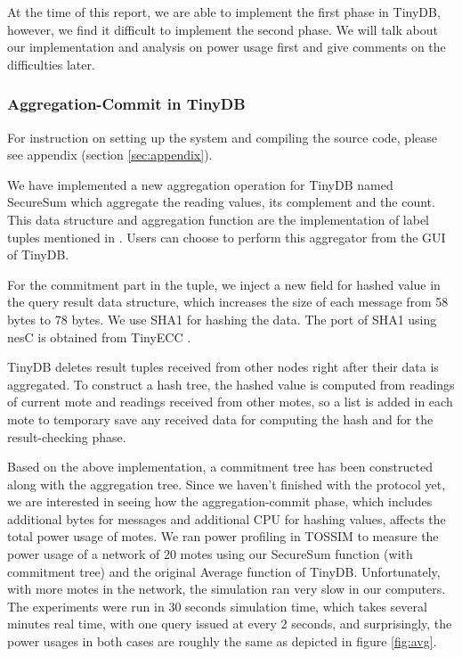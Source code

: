 \documentclass[a4paper]{article}
\begin{document}
At the time of this report, we are able to implement the first phase in TinyDB,
however, we find it difficult to implement the second phase. We will talk about
our implementation and analysis on power usage first and give comments 
on the difficulties later.

\subsubsection{Aggregation-Commit in TinyDB}

For instruction on setting up the system and compiling the source code, please see
appendix (section \ref{sec:appendix}). 

We have implemented a new aggregation
operation for TinyDB named SecureSum which aggregate the reading values, its
complement and the count. This data structure and aggregation function are the
implementation of label tuples mentioned in \cite{Chan06}. Users can choose to perform 
this aggregator from the GUI of TinyDB. 

For the commitment part in the tuple, we inject a new field for hashed value in
the query result data structure, which increases the size of each message from 58 bytes to 
78 bytes. We use SHA1 for hashing the data. The port of SHA1 using nesC is
obtained from TinyECC \cite{TinyECC}.

TinyDB deletes result tuples received from other nodes right after their data is
aggregated. To construct a hash tree, the hashed value is computed from readings
of current mote and readings received from other motes, so a list is added
in each mote to temporary save any received data for computing the hash and
for the result-checking phase.

Based on the above implementation, a commitment tree has been constructed along
with the aggregation tree. Since we haven't finished with the protocol yet, we are 
interested in seeing how the aggregation-commit phase, which includes additional bytes
for messages and additional CPU for hashing values, affects the total power usage
of motes. We ran power profiling in TOSSIM to measure the power usage of a network
of 20 motes using our SecureSum function (with commitment tree) and the original 
Average function of TinyDB. Unfortunately, with more motes in the network, the simulation ran
very slow in our computers. The experiments were run in 30 seconds simulation time,
which takes several minutes real time, with one query issued at every 2 seconds, 
and surprisingly, the power usages in both cases
are roughly the same as depicted in figure \ref{fig:avg}. 
\end{document}
